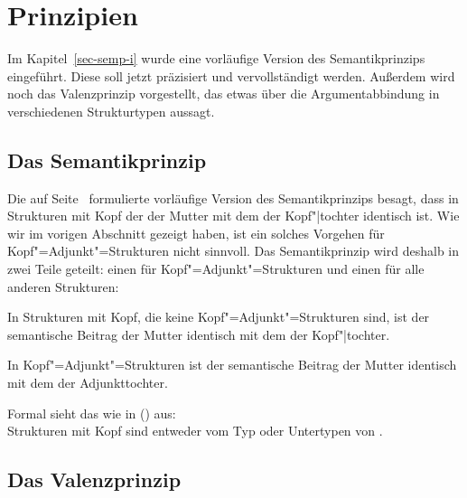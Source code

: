 \section{Prinzipien}
\label{sec-prinzipien}

Im Kapitel~\ref{sec-semp-i} wurde eine vorläufige Version des Semantikprinzips eingeführt. Diese
soll jetzt präzisiert und vervollständigt werden. Außerdem wird noch das Valenzprinzip vorgestellt, das etwas über
die Argumentabbindung in verschiedenen Strukturtypen aussagt.

\subsection{Das Semantikprinzip}

Die auf Seite~\pageref{semp-i} formulierte vorläufige Version des Semantikprinzips besagt,
dass in Strukturen mit Kopf der \contw der Mutter mit dem \contw der Kopf"|tochter
identisch ist. Wie wir im vorigen Abschnitt gezeigt haben, ist ein solches Vorgehen für
Kopf"=Adjunkt"=Strukturen nicht sinnvoll. Das Semantikprinzip wird deshalb in zwei Teile geteilt:
einen für Kopf"=Adjunkt"=Strukturen und einen für alle anderen Strukturen:
\begin{prinzip-break}[Semantikprinzip]
\label{semp}
In Strukturen mit Kopf, die keine Kopf"=Adjunkt"=Strukturen sind, ist der
semantische Beitrag der Mutter identisch mit dem der Kopf"|tochter.

In Kopf"=Adjunkt"=Strukturen ist der semantische Beitrag der Mutter
identisch mit dem der Adjunkttochter.
\end{prinzip-break}
Formal sieht das wie in () aus:
\ea
{} \impl
{}\\[2mm]

 \impl
{}
\z
Strukturen mit Kopf sind entweder vom Typ  oder Untertypen von
.


\subsection{Das Valenzprinzip}
\label{sec-valp}


